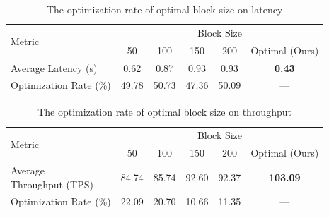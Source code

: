 \documentclass[a4paper,fleqn]{cas-dc}
\begin{document}
\begin{table}[!htbp]
	\centering
	\footnotesize
	\caption{The optimization rate of optimal block size on latency}
	\label{tab:dw_dqn_latency}
	\setlength{\tabcolsep}{3pt}
	\begin{tabular}{@{}l*{5}{c}@{}}
		\toprule
		\multirow{2}{*}{Metric} & \multicolumn{5}{c}{Block Size} \\
		\cmidrule(lr){2-6}
		& 50 & 100 & 150 & 200 & Optimal (Ours) \\
		\midrule
		Average Latency (s) & 0.62 & 0.87 & 0.93 & 0.93 & \textbf{0.43} \\
		Optimization Rate (\%) & 49.78 & 50.73 & 47.36 & 50.09 & — \\
		\bottomrule
	\end{tabular}
\end{table}



\begin{table}[!htbp]
	\centering
	\caption{The optimization rate of optimal block size on throughput}
	\label{tab:dw_dqn_throughput}
	\setlength{\tabcolsep}{3pt} %
	\footnotesize
	\begin{tabular}{@{}lccccc@{}}
		\toprule
		\multirow{2}{*}{Metric} & \multicolumn{5}{c}{Block Size} \\
		\cmidrule(lr){2-6}
		& 50 & 100 & 150 & 200 & Optimal (Ours) \\
		\midrule
		\makecell[l]{Average\\Throughput (TPS)} & 84.74 & 85.74 & 92.60 & 92.37 & \textbf{103.09} \\
		Optimization Rate (\%) & 22.09 & 20.70 & 10.66 & 11.35 & — \\ %
		\bottomrule
	\end{tabular}
\end{table}


\end{document}
